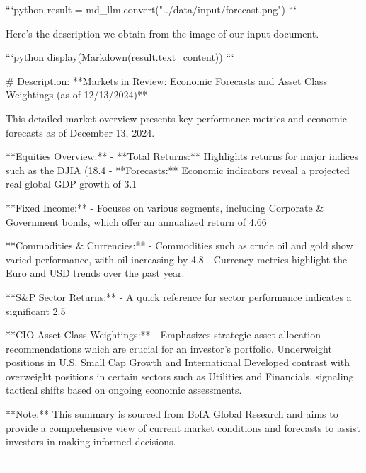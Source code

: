 {{```python
result = md_llm.convert("../data/input/forecast.png")
```

Here's the description we obtain from the image of our input document.


```python
display(Markdown(result.text_content))
```



# Description:
**Markets in Review: Economic Forecasts and Asset Class Weightings (as of 12/13/2024)**

This detailed market overview presents key performance metrics and economic forecasts as of December 13, 2024.

**Equities Overview:**
- **Total Returns:** Highlights returns for major indices such as the DJIA (18.4%
- **Forecasts:** Economic indicators reveal a projected real global GDP growth of 3.1%

**Fixed Income:**
- Focuses on various segments, including Corporate & Government bonds, which offer an annualized return of 4.66%

**Commodities & Currencies:**
- Commodities such as crude oil and gold show varied performance, with oil increasing by 4.8%
- Currency metrics highlight the Euro and USD trends over the past year.

**S&P Sector Returns:**
- A quick reference for sector performance indicates a significant 2.5%

**CIO Asset Class Weightings:**
- Emphasizes strategic asset allocation recommendations which are crucial for an investor's portfolio. Underweight positions in U.S. Small Cap Growth and International Developed contrast with overweight positions in certain sectors such as Utilities and Financials, signaling tactical shifts based on ongoing economic assessments.

**Note:** This summary is sourced from BofA Global Research and aims to provide a comprehensive view of current market conditions and forecasts to assist investors in making informed decisions.



---

}}
